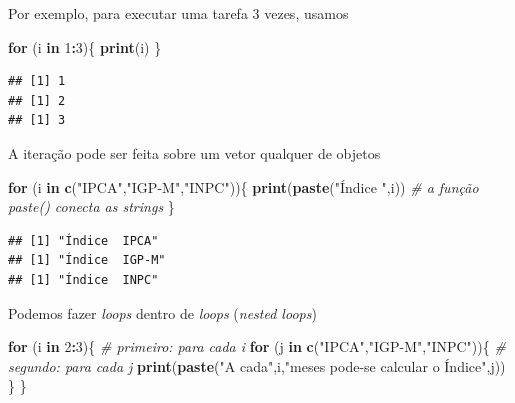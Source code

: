 \documentclass[
]{book}
\newenvironment{Shaded}{\begin{snugshade}}{\end{snugshade}}
\newcommand{\CommentTok}[1]{\textcolor[rgb]{0.56,0.35,0.01}{\textit{#1}}}
\newcommand{\ControlFlowTok}[1]{\textcolor[rgb]{0.13,0.29,0.53}{\textbf{#1}}}
\newcommand{\DecValTok}[1]{\textcolor[rgb]{0.00,0.00,0.81}{#1}}
\newcommand{\KeywordTok}[1]{\textcolor[rgb]{0.13,0.29,0.53}{\textbf{#1}}}
\newcommand{\NormalTok}[1]{#1}
\newcommand{\OperatorTok}[1]{\textcolor[rgb]{0.81,0.36,0.00}{\textbf{#1}}}
\newcommand{\StringTok}[1]{\textcolor[rgb]{0.31,0.60,0.02}{#1}}
\theoremstyle{definition}
\theoremstyle{definition}
\theoremstyle{definition}
\theoremstyle{remark}
\begin{document}
Por exemplo, para executar uma tarefa 3 vezes, usamos

\begin{Shaded}
\begin{Highlighting}[]
\ControlFlowTok{for}\NormalTok{ (i }\ControlFlowTok{in} \DecValTok{1}\OperatorTok{:}\DecValTok{3}\NormalTok{)\{}
  \KeywordTok{print}\NormalTok{(i)}
\NormalTok{\}}
\end{Highlighting}
\end{Shaded}

\begin{verbatim}
## [1] 1
## [1] 2
## [1] 3
\end{verbatim}

A iteração pode ser feita sobre um vetor qualquer de objetos

\begin{Shaded}
\begin{Highlighting}[]
\ControlFlowTok{for}\NormalTok{ (i }\ControlFlowTok{in} \KeywordTok{c}\NormalTok{(}\StringTok{"IPCA"}\NormalTok{,}\StringTok{"IGP-M"}\NormalTok{,}\StringTok{"INPC"}\NormalTok{))\{}
  \KeywordTok{print}\NormalTok{(}\KeywordTok{paste}\NormalTok{(}\StringTok{"Índice "}\NormalTok{,i))  }\CommentTok{# a função paste() conecta as strings}
\NormalTok{\}}
\end{Highlighting}
\end{Shaded}

\begin{verbatim}
## [1] "Índice  IPCA"
## [1] "Índice  IGP-M"
## [1] "Índice  INPC"
\end{verbatim}

Podemos fazer \emph{loops} dentro de \emph{loops} (\emph{nested loops})

\begin{Shaded}
\begin{Highlighting}[]
\ControlFlowTok{for}\NormalTok{ (i }\ControlFlowTok{in} \DecValTok{2}\OperatorTok{:}\DecValTok{3}\NormalTok{)\{}
  \CommentTok{# primeiro: para cada i}
  \ControlFlowTok{for}\NormalTok{ (j }\ControlFlowTok{in} \KeywordTok{c}\NormalTok{(}\StringTok{"IPCA"}\NormalTok{,}\StringTok{"IGP-M"}\NormalTok{,}\StringTok{"INPC"}\NormalTok{))\{}
    \CommentTok{# segundo: para cada j }
    \KeywordTok{print}\NormalTok{(}\KeywordTok{paste}\NormalTok{(}\StringTok{"A cada"}\NormalTok{,i,}\StringTok{"meses pode-se calcular o Índice"}\NormalTok{,j))}
\NormalTok{  \}}
\NormalTok{\}}
\end{Highlighting}
\end{Shaded}
\end{document}
